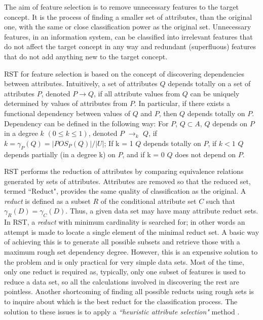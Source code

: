 \documentclass{llncs}
\begin{document}
The aim of feature selection is to remove unnecessary features to the target concept. It is the process of finding a smaller set of attributes, than the original one, with the same or close classification power as the original set. Unnecessary features, in an information system, can be classified into irrelevant features  that do not affect the target concept in any way  and redundant (superfluous) features that do not add anything new to the target concept.

RST for feature selection is based on the concept of  discovering dependencies between attributes. Intuitively, a set of attributes $Q$ depends totally on a set of attributes $P$, denoted $P \rightarrow Q$, if all attribute values from $Q$ can be uniquely determined by values of attributes from $P$. In particular, if there exists a functional dependency between values of $Q$ and $P$, then $Q$ depends totally on $P$. Dependency can be defined in the following way: For $P$, $Q  \subset A$, $Q$  depends on $P$ in a degree $k$ $(0 \leq k \leq 1)$,  denoted $P$ $\rightarrow_{k}$ $Q$, if $k = \gamma_{P}(Q) = |POS_{P}(Q)|/|U|$;  If k = 1 $Q$ depends totally on $P$, if $k < 1 $  $Q$ depends partially (in a degree k) on $P$, and if k = 0 $Q$ does not depend on $P$.

RST performs the reduction of attributes by comparing equivalence relations generated by sets of attributes. Attributes are removed so that the reduced set, termed ``Reduct", provides the same quality of classification as the original. A \emph{reduct} is defined as a subset $R$ of the conditional attribute set $C$ such that $\gamma_{R}(D) = \gamma_{C}(D)$. Thus, a given data set may have many attribute reduct sets. In RST, a \emph{reduct} with minimum cardinality is searched for; in other words an attempt is made to locate a single element of the minimal reduct set. A basic way of achieving this is to generate all possible subsets and retrieve those with a maximum rough set dependency degree. However, this is an expensive solution to the problem and is only practical for very simple data sets. Most of the time, only one reduct is required as, typically, only one subset of features is used to reduce a data set, so all the calculations involved in discovering the rest are pointless. Another shortcoming of finding all possible reducts using rough sets is to inquire about which is the best reduct for the classification process.  The solution to these issues is to apply a \emph{``heuristic attribute selection"} method \cite{zhong2001using}.
\end{document}
